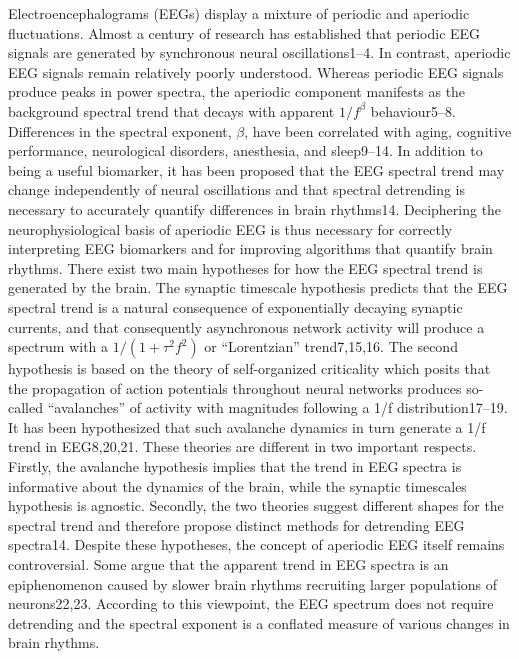 Electroencephalograms (EEGs) display a mixture of periodic and aperiodic fluctuations. Almost a century of research has established that periodic EEG signals are generated by synchronous neural oscillations1–4. In contrast, aperiodic EEG signals remain relatively poorly understood. Whereas periodic EEG signals produce peaks in power spectra, the aperiodic component manifests as the background spectral trend that decays with apparent $1/f^\beta$ behaviour5–8. Differences in the spectral exponent, $\beta$, have been correlated with aging, cognitive performance, neurological disorders, anesthesia, and sleep9–14. In addition to being a useful biomarker, it has been proposed that the EEG spectral trend may change independently of neural oscillations and that spectral detrending is necessary to accurately quantify differences in brain rhythms14. Deciphering the neurophysiological basis of aperiodic EEG is thus necessary for correctly interpreting EEG biomarkers and for improving algorithms that quantify brain rhythms.
There exist two main hypotheses for how the EEG spectral trend is generated by the brain. The synaptic timescale hypothesis predicts that the EEG spectral trend is a natural consequence of exponentially decaying synaptic currents, and that consequently asynchronous network activity will produce a spectrum with a $1/(1+\tau^2f^2)$ or “Lorentzian” trend7,15,16. The second hypothesis is based on the theory of self-organized criticality which posits that the propagation of action potentials throughout neural networks produces so-called “avalanches” of activity with magnitudes following a 1/f distribution17–19. It has been hypothesized that such avalanche dynamics in turn generate a 1/f trend in EEG8,20,21. These theories are different in two important respects. Firstly, the avalanche hypothesis implies that the trend in EEG spectra is informative about the dynamics of the brain, while the synaptic timescales hypothesis is agnostic. Secondly, the two theories suggest different shapes for the spectral trend and therefore propose distinct methods for detrending EEG spectra14.  
Despite these hypotheses, the concept of aperiodic EEG itself remains controversial. Some argue that the apparent trend in EEG spectra is an epiphenomenon caused by slower brain rhythms recruiting larger populations of neurons22,23. According to this viewpoint, the EEG spectrum does not require detrending and the spectral exponent is a conflated measure of various changes in brain rhythms. 
